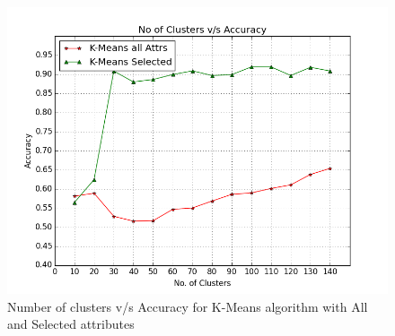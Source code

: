 \documentclass[conference]{IEEEtran}
\begin{document}
\begin{figure}[!t]
	\centering
	\includegraphics[width=1\columnwidth]{k_means_selected_all}
	\caption{Number of clusters v/s Accuracy for K-Means algorithm with All and Selected attributes}
	\label{fig_k_means_all}
\end{figure}
\end{document}
